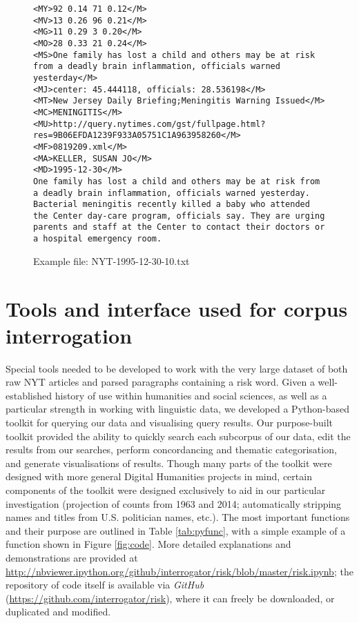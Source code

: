 \begin{figure}
\footnotesize
\begin{lstlisting}[breaklines]
<MY>92 0.14 71 0.12</M>
<MV>13 0.26 96 0.21</M>
<MG>11 0.29 3 0.20</M>
<MO>28 0.33 21 0.24</M>
<MS>One family has lost a child and others may be at risk from a deadly brain inflammation, officials warned yesterday</M>
<MJ>center: 45.444118, officials: 28.536198</M>
<MT>New Jersey Daily Briefing;Meningitis Warning Issued</M>
<MC>MENINGITIS</M>
<MU>http://query.nytimes.com/gst/fullpage.html?res=9B06EFDA1239F933A05751C1A963958260</M>
<MF>0819209.xml</M>
<MA>KELLER, SUSAN JO</M>
<MD>1995-12-30</M>
One family has lost a child and others may be at risk from a deadly brain inflammation, officials warned yesterday. Bacterial meningitis recently killed a baby who attended the Center day-care program, officials say. They are urging parents and staff at the Center to contact their doctors or a hospital emergency room.
\end{lstlisting}
\caption{Example file: NYT-1995-12-30-10.txt}
\label{fig:exfile}
\end{figure}

\section{Tools and interface used for corpus interrogation}

Special tools needed to be developed to work with the very large dataset of both raw NYT articles and parsed paragraphs containing a risk word. Given a well-established history of use within humanities and social sciences, as well as a particular strength in working with linguistic data, we developed a Python-based toolkit for querying our data and visualising query results. Our purpose-built toolkit provided the ability to quickly search each subcorpus of our data, edit the results from our searches, perform concordancing and thematic categorisation, and generate visualisations of results. Though many parts of the toolkit were designed with more general Digital Humanities projects in mind, certain components of the toolkit were designed exclusively to aid in our particular investigation (projection of counts from 1963 and 2014; automatically stripping names and titles from U.S. politician names, etc.). The most important functions and their purpose are outlined in Table \ref{tab:pyfunc}, with a simple example of a function shown in Figure \ref{fig:code}. More detailed explanations and demonstrations are provided at \url{http://nbviewer.ipython.org/github/interrogator/risk/blob/master/risk.ipynb}; the repository of code itself is available via \emph{GitHub} (\url{https://github.com/interrogator/risk}), where it can freely be downloaded, or duplicated and modified.

